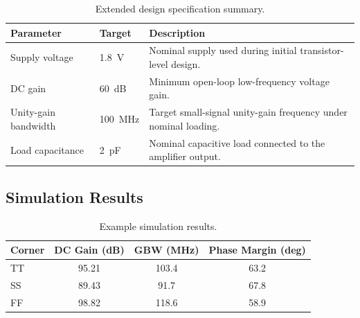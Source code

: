 \begin{table}[htbp]
	\centering
	
	\caption{Extended design specification summary.}
	\label{tab:extended_specifications}
	
	\begin{tabularx}{\textwidth}{l l X}
		\toprule
		Parameter & Target & Description \\
		\midrule
		
		Supply voltage
		& \qty{1.8}{\volt}
		& Nominal supply used during initial transistor-level design. \\
		
		DC gain
		& \qty{60}{\deci\bel}
		& Minimum open-loop low-frequency voltage gain. \\
		
		Unity-gain bandwidth
		& \qty{100}{\mega\hertz}
		& Target small-signal unity-gain frequency under nominal loading. \\
		
		Load capacitance
		& \qty{2}{\pico\farad}
		& Nominal capacitive load connected to the amplifier output. \\
		
		\bottomrule
	\end{tabularx}
	
\end{table}

\subsection{Simulation Results}

\begin{table}[htbp]
	\centering
	
	\caption{Example simulation results.}
	\label{tab:simulation_results}
	
	\begin{tabular}{l S S S}
		\toprule
		Corner
		& {DC Gain (dB)}
		& {GBW (MHz)}
		& {Phase Margin (deg)} \\
		\midrule
		
		TT & 95.21 & 103.4 & 63.2 \\
		SS & 89.43 & 91.7  & 67.8 \\
		FF & 98.82 & 118.6 & 58.9 \\
		
		\bottomrule
	\end{tabular}
	
\end{table}